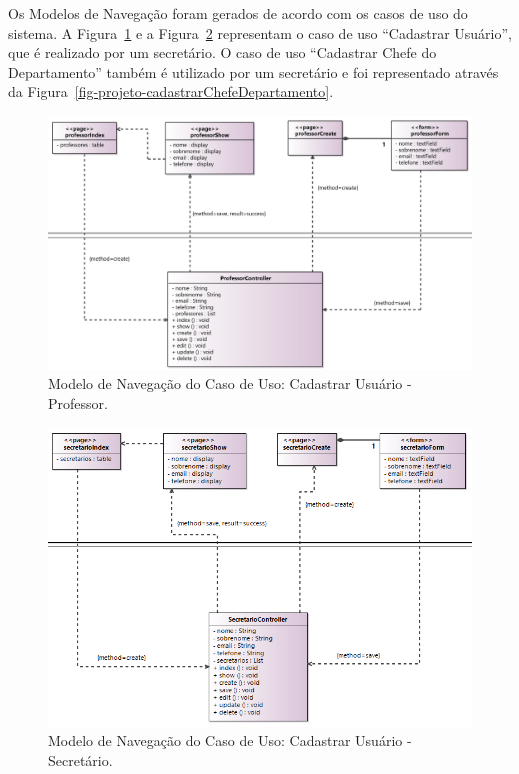 Os Modelos de Navegação foram gerados de acordo com os casos de uso do sistema. A Figura~\ref{fig-projeto-cadastrarUsuarioProfessor} e a Figura~\ref{fig-projeto-cadastrarUsuarioSecretario} representam o caso de uso ``Cadastrar Usuário'', que é realizado por um secretário. O caso de uso ``Cadastrar Chefe do Departamento'' também é utilizado por um secretário e foi representado através da Figura~\ref{fig-projeto-cadastrarChefeDepartamento}. 

\begin{figure}[!h]
	\centering
	\includegraphics[width=1\textwidth]{figuras/fig-projeto-cadastrarUsuarioProfessor.png}
	\caption{Modelo de Navegação do Caso de Uso: Cadastrar Usuário - Professor.}
	\label{fig-projeto-cadastrarUsuarioProfessor}
\end{figure}

\begin{figure}[!h]
	\centering
	\includegraphics[width=1\textwidth]{figuras/fig-projeto-cadastrarUsuarioSecretario.png}
	\caption{Modelo de Navegação do Caso de Uso: Cadastrar Usuário - Secretário.}
	\label{fig-projeto-cadastrarUsuarioSecretario}
\end{figure}

